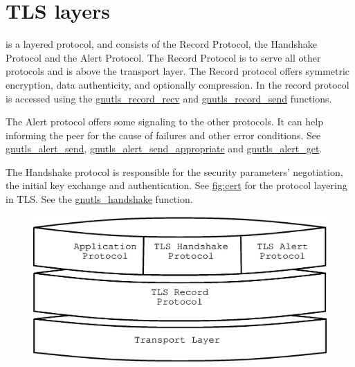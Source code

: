 \newpage
\section{TLS layers}

\tlsI{} is a layered protocol, and consists of the Record Protocol,
the Handshake Protocol and the Alert Protocol. The Record Protocol
is to serve all other protocols and is above the transport layer.
The Record protocol offers symmetric encryption, data authenticity, and
optionally compression.
In \gnutls{} the record protocol is accessed using the 
\hyperref{gnutls\_record\_recv()}{gnutls\_record\_recv() (see Section }{)}{gnutls_record_recv} and
\hyperref{gnutls\_record\_send()}{gnutls\_record\_send() (see Section }{)}{gnutls_record_send}
functions.

\par
The Alert protocol offers some signaling to the other protocols. It can
help informing the peer for the cause of failures and other error
conditions. See
\hyperref{gnutls\_alert\_send()}{gnutls\_alert\_send() (see Section }{)}{gnutls_alert_send},
\hyperref{gnutls\_alert\_send\_appropriate()}{gnutls\_alert\_send\_appropriate() (see Section }{)}{gnutls_alert_send_appropriate}
and
\hyperref{gnutls\_alert\_get()}{gnutls\_alert\_get() (see Section }{)}{gnutls_alert_get}.

\par 
The Handshake protocol is responsible for the security parameters'
negotiation, the initial key exchange and
authentication. See \hyperref{figure}{figure }{}{fig:cert} for the
protocol layering in TLS. See the
\hyperref{gnutls\_handshake()}{gnutls\_handshake() (see Section }{)}{gnutls_handshake} function.

\begin{figure}[hbtp]
\includegraphics{layers}
\label{fig:layers}

\end{figure}


\addvspace{1.5cm}

